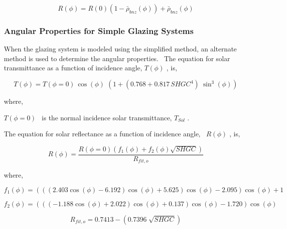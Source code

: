 \begin{equation}
R(\phi ) = R(0)(1 - {\bar \rho_{bnz}}(\phi )) + {\bar \rho_{bnz}}(\phi )
\end{equation}

\subsubsection{Angular Properties for Simple Glazing Systems}\label{angular-properties-for-simple-glazing-systems}

When the glazing system is modeled using the simplified method, an alternate method is used to determine the angular properties.~ The equation for solar transmittance as a function of incidence angle, \(T\left( \phi \right)\) , is,

\begin{equation}
T\left( \phi  \right) = T\left( {\phi  = 0} \right)\,\cos \left( \phi  \right)\,\,\left( {1 + (0.768 + 0.817\,SHG{C^4})\;{{\sin }^3}\left( \phi  \right)} \right)
\end{equation}

where,

\(T\left( {\phi = 0} \right)\) ~is the normal incidence solar transmittance, \({T_{Sol}}\) .

The equation for solar reflectance as a function of incidence angle,~ \(R\left( \phi \right)\) , is,

\begin{equation}
R\left( \phi  \right) = \frac{{R\left( {\phi  = 0} \right)\left( {{f_1}\left( \phi  \right) + {f_2}\left( \phi  \right)\sqrt {SHGC} } \right)}}{{{R_{fit,o}}}}
\end{equation}

where,

\begin{equation}
{f_1}\left( \phi  \right) = \left( {\left( {\left( {2.403\cos \left( \phi  \right) - 6.192} \right)\cos \left( \phi  \right) + 5.625} \right)\cos \left( \phi  \right) - 2.095} \right)\cos \left( \phi  \right) + 1
\end{equation}

\begin{equation}
{f_2}\left( \phi  \right) = \left( {\left( {\left( { - 1.188\cos \left( \phi  \right) + 2.022} \right)\cos \left( \phi  \right) + 0.137} \right)\cos \left( \phi  \right) - 1.720} \right)\cos \left( \phi  \right)
\end{equation}

\begin{equation}
{R_{fit,o}} = 0.7413 - \left( {0.7396\;\sqrt {SHGC} } \right)
\end{equation}

